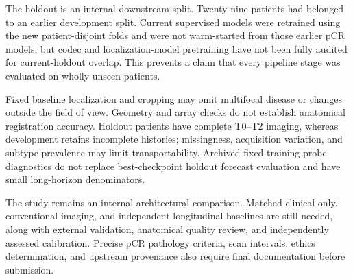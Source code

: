 The holdout is an internal downstream split. Twenty-nine patients had belonged to an earlier development split. Current supervised models were retrained using the new patient-disjoint folds and were not warm-started from those earlier pCR models, but codec and localization-model pretraining have not been fully audited for current-holdout overlap. This prevents a claim that every pipeline stage was evaluated on wholly unseen patients.

Fixed baseline localization and cropping may omit multifocal disease or changes outside the field of view. Geometry and array checks do not establish anatomical registration accuracy. Holdout patients have complete T0--T2 imaging, whereas development retains incomplete histories; missingness, acquisition variation, and subtype prevalence may limit transportability. Archived fixed-training-probe diagnostics do not replace best-checkpoint holdout forecast evaluation and have small long-horizon denominators.

The study remains an internal architectural comparison. Matched clinical-only, conventional imaging, and independent longitudinal baselines are still needed, along with external validation, anatomical quality review, and independently assessed calibration. Precise pCR pathology criteria, scan intervals, ethics determination, and upstream provenance also require final documentation before submission.
